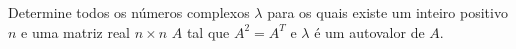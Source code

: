 Determine todos os números complexos \(\lambda\) para os quais existe um inteiro positivo \(n\) e uma matriz real \(n\times n\) \(A\) tal que \(A^2=A^T\) e \(\lambda\) é um autovalor de \(A\).
